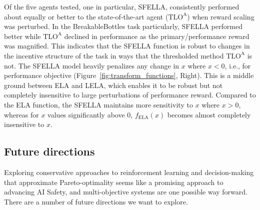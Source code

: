 


Of the five agents tested, one in particular, SFELLA, consistently performed about equally or better to the state-of-the-art agent ($\text{TLO}^\text{A}$) when reward scaling was perturbed. In the BreakableBottles task particularly, SFELLA performed better while $\text{TLO}^\text{A}$ declined in performance as the primary/performance reward was magnified. This indicates that the SFELLA function is robust to changes in the incentive structure of the task in ways that the thresholded method $\text{TLO}^\text{A}$ is not. The SFELLA model heavily penalizes any change in $x$ where $x<0$, i.e., for performance objective (Figure~\ref{fig:transform_functions}, Right). This is a middle ground between ELA and LELA, which enables it to be robust but not completely insensitive to large perturbations of performance reward. Compared to the ELA function, the SFELLA maintains more sensitivity to $x$ where $x>0$, whereas for $x$ values significantly above 0, $f_{\text{ELA}}(x)$ becomes almost completely insensitive to $x$. 



\subsection{Future directions}

Exploring conservative approaches to reinforcement learning and decision-making that approximate Pareto-optimality seems like a promising approach to advancing AI Safety, and multi-objective systems are one possible way forward. There are a number of future directions we want to explore.

